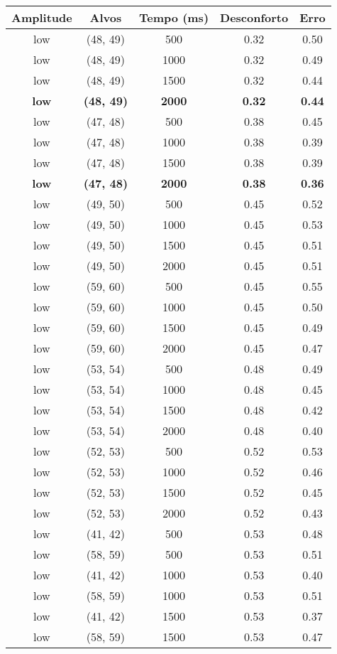 \begin{tabular}{c c c c c}
\hline
Amplitude & Alvos & Tempo (ms) & Desconforto & Erro \\
\hline
low & (48, 49) &  500 & 0.32 & 0.50 \\
low & (48, 49) &  1000 & 0.32 & 0.49 \\
low & (48, 49) &  1500 & 0.32 & 0.44 \\
\textbf{low} & \textbf{(48, 49)} & \textbf{ 2000} & \textbf{0.32} & \textbf{0.44} \\
low & (47, 48) &  500 & 0.38 & 0.45 \\
low & (47, 48) &  1000 & 0.38 & 0.39 \\
low & (47, 48) &  1500 & 0.38 & 0.39 \\
\textbf{low} & \textbf{(47, 48)} & \textbf{ 2000} & \textbf{0.38} & \textbf{0.36} \\
low & (49, 50) &  500 & 0.45 & 0.52 \\
low & (49, 50) &  1000 & 0.45 & 0.53 \\
low & (49, 50) &  1500 & 0.45 & 0.51 \\
low & (49, 50) &  2000 & 0.45 & 0.51 \\
low & (59, 60) &  500 & 0.45 & 0.55 \\
low & (59, 60) &  1000 & 0.45 & 0.50 \\
low & (59, 60) &  1500 & 0.45 & 0.49 \\
low & (59, 60) &  2000 & 0.45 & 0.47 \\
low & (53, 54) &  500 & 0.48 & 0.49 \\
low & (53, 54) &  1000 & 0.48 & 0.45 \\
low & (53, 54) &  1500 & 0.48 & 0.42 \\
low & (53, 54) &  2000 & 0.48 & 0.40 \\
low & (52, 53) &  500 & 0.52 & 0.53 \\
low & (52, 53) &  1000 & 0.52 & 0.46 \\
low & (52, 53) &  1500 & 0.52 & 0.45 \\
low & (52, 53) &  2000 & 0.52 & 0.43 \\
low & (41, 42) &  500 & 0.53 & 0.48 \\
low & (58, 59) &  500 & 0.53 & 0.51 \\
low & (41, 42) &  1000 & 0.53 & 0.40 \\
low & (58, 59) &  1000 & 0.53 & 0.51 \\
low & (41, 42) &  1500 & 0.53 & 0.37 \\
low & (58, 59) &  1500 & 0.53 & 0.47 \\

\end{tabular}
